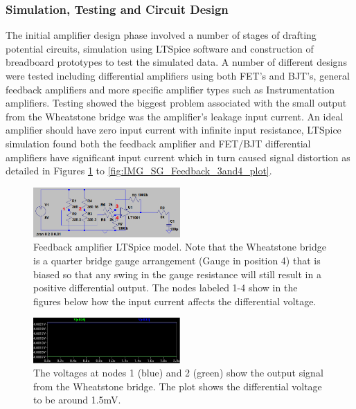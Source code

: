 \subsubsection{Simulation, Testing and Circuit Design}
The initial amplifier design phase involved a number of stages of drafting potential circuits, simulation using LTSpice software and construction of breadboard prototypes to test the simulated data. A number of different designs were tested including differential amplifiers using both FET's and BJT's, general feedback amplifiers and more specific amplifier types such as Instrumentation amplifiers. Testing showed the biggest problem associated with the small output from the Wheatstone bridge was the amplifier's leakage input current. An ideal amplifier should have zero input current with infinite input resistance, LTSpice simulation found both the feedback amplifier and FET/BJT differential amplifiers have significant input current which in turn caused signal distortion as detailed in Figures \ref{fig:IMG_SG_Feedback_LT} to \ref{fig:IMG_SG_Feedback_3and4_plot}.\\

\begin{figure}[h!]
	\centering
	\includegraphics[width=0.5\textwidth]{Images/Strain_Gauges/IMG_SG_Feedback_LT.png}
	\caption{Feedback amplifier LTSpice model. Note that the Wheatstone bridge is a quarter bridge gauge arrangement (Gauge in position 4) that is biased so that any swing in the gauge 		resistance will still result in a positive differential output. The nodes labeled 1-4 show in the figures below how the input current affects the differential voltage.}
	\label{fig:IMG_SG_Feedback_LT}
\end{figure}

\begin{figure}[h!]
	\centering
	\includegraphics[width=0.5\textwidth]{Images/Strain_Gauges/IMG_SG_Feedback_1and2_plot.png}
	\caption{The voltages at nodes 1 (blue) and 2 (green) show the output signal from the Wheatstone bridge. The plot shows the differential voltage to be around 1.5mV.}
	\label{fig:IMG_SG_Feedback_1and2_plot}
\end{figure}

